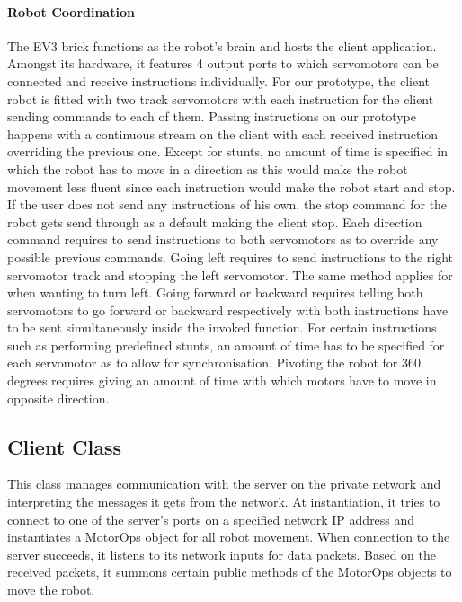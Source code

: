 \paragraph{Robot Coordination}
The EV3 brick functions as the robot's brain and hosts the client application. Amongst its hardware, it features 4 output ports to which servomotors can be connected and receive instructions individually. For our prototype, the client robot is fitted with two track servomotors with each instruction for the client sending commands to each of them.
Passing instructions on our prototype happens with a continuous stream on the client with each received instruction overriding the previous one. Except for stunts, no amount of time is specified in which the robot has to move in a direction as this would make the robot movement less fluent since each instruction would make the robot start and stop.
If the user does not send any instructions of his own, the stop command for the robot gets send through as a default making the client stop. Each direction command requires to send instructions to both servomotors as to override any possible previous commands. Going left requires to send instructions to the right servomotor track and stopping the left servomotor. The same method applies for when wanting to turn left. Going forward or backward requires telling both servomotors to go forward or backward respectively with both instructions have to be sent simultaneously inside the invoked function. For certain instructions such as performing predefined stunts, an amount of time has to be specified for each servomotor as to allow for synchronisation. Pivoting the robot for 360 degrees requires giving an amount of time with which motors have to move in opposite direction.

\newpage



\subsection{Client Class}
This class manages communication with the server on the private network and interpreting the messages it gets from the network. At instantiation, it tries to connect to one of the server's ports on a specified network IP address and instantiates a MotorOps object for all robot movement. When connection to the server succeeds, it listens to its network inputs for data packets. Based on the received packets, it summons certain public methods of the MotorOps objects to move the robot.


